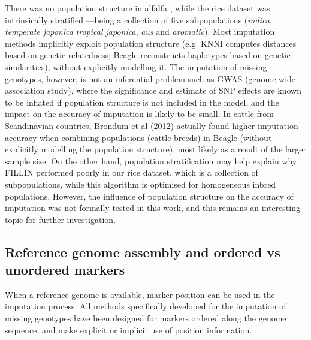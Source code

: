 There was no population structure in alfalfa \cite{Annicchiarico2015}, while the rice dataset was intrinsically stratified ---being a collection of five subpopulations (\textit{indica}, \textit{temperate japonica} \textit{tropical japonica}, \textit{aus} and \textit{aromatic}). Most imputation methods implicitly exploit population structure (e.g. KNNI computes distances based on genetic relatedness; Beagle reconstructs haplotypes based on genetic similarities), without explicitly modelling it. The imputation of missing genotypes, however, is not an inferential problem such as GWAS (genome-wide association study), where the significance and estimate of SNP effects are known to be inflated if population structure is not included in the model, and the impact on the accuracy of imputation is likely to be small. In cattle from Scandinavian countries, Brondum et al (2012) actually found higher imputation accuracy when combining populations (cattle breeds) in Beagle (without explicitly modelling the population structure), most likely as a result of the larger sample size. On the other hand, population stratification may help explain why FILLIN performed poorly in our rice dataset, which is a collection of subpopulations, while this algorithm is optimised for homogeneous inbred populations. 
However, the influence of population structure on the accuracy of imputation was not formally tested in this work, and this remains an interesting topic for further investigation.


\subsection{Reference genome assembly and ordered vs unordered markers}
\label{sec:reference_genome_ordered_vs_unordered}
When a reference genome is available, marker position can be used in the imputation process. All methods specifically developed for the imputation of missing genotypes have been designed for markers ordered along the genome sequence, and make explicit or implicit use of position information.

